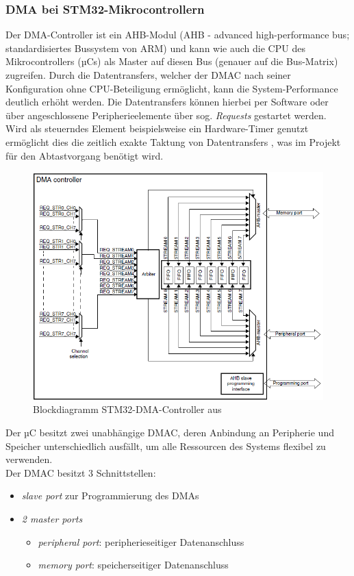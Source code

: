 \documentclass[a4paper, portrait, 12pt]{scrartcl} %
\begin{document}
\subsubsection{DMA bei STM32-Mikrocontrollern}
Der DMA-Controller ist ein AHB-Modul (AHB - advanced high-performance bus; standardisiertes Bussystem von ARM) und kann wie auch die CPU des Mikrocontrollers (µCs) als Master auf diesen Bus (genauer auf die Bus-Matrix) zugreifen. Durch die Datentransfers, welcher der DMAC nach seiner Konfiguration ohne CPU-Beteiligung ermöglicht, kann die System-Performance deutlich erhöht werden. Die Datentransfers können hierbei per Software oder über angeschlossene Peripherieelemente über sog. \emph{Requests} gestartet werden. Wird als steuerndes Element beispielsweise ein Hardware-Timer genutzt ermöglicht dies die zeitlich exakte Taktung von Datentransfers \cite[S. 6]{STmicroelectronics2016}, was im Projekt für den Abtastvorgang benötigt wird.

\begin{figure}[H]
	\centering
    \includegraphics[scale=0.52]{STM32_DMAC.png} 
	\caption{Blockdiagramm STM32-DMA-Controller aus \cite[S. 7]{STmicroelectronics2016}}
	\label{fig:dmac}
\end{figure}

Der µC besitzt zwei unabhängige DMAC, deren Anbindung an Peripherie und Speicher unterschiedlich ausfällt, um alle Ressourcen des Systems flexibel zu verwenden.\\

Der DMAC besitzt 3 Schnittstellen:
\begin{itemize}
	\item \emph{slave port} zur Programmierung des DMAs
	\item \emph{2 master ports} \begin{itemize}
		\item \emph{peripheral port}: peripherieseitiger Datenanschluss
		\item \emph{memory port}: speicherseitiger Datenanschluss
	\end{itemize}
\end{itemize}
\end{document}
